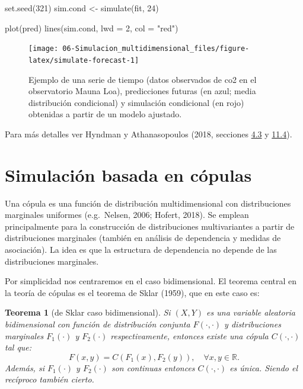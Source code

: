 \documentclass[
]{book}
\newenvironment{Shaded}{\begin{snugshade}}{\end{snugshade}}
\newcommand{\AttributeTok}[1]{\textcolor[rgb]{0.77,0.63,0.00}{#1}}
\newcommand{\DecValTok}[1]{\textcolor[rgb]{0.00,0.00,0.81}{#1}}
\newcommand{\FunctionTok}[1]{\textcolor[rgb]{0.00,0.00,0.00}{#1}}
\newcommand{\NormalTok}[1]{#1}
\newcommand{\OtherTok}[1]{\textcolor[rgb]{0.56,0.35,0.01}{#1}}
\newcommand{\StringTok}[1]{\textcolor[rgb]{0.31,0.60,0.02}{#1}}
\theoremstyle{break}
\newtheorem{theorem}{Teorema}[chapter]
\theoremstyle{nonumberplain}
\begin{document}
\begin{Shaded}
\begin{Highlighting}[]
\FunctionTok{set.seed}\NormalTok{(}\DecValTok{321}\NormalTok{)}
\NormalTok{sim.cond }\OtherTok{\textless{}{-}} \FunctionTok{simulate}\NormalTok{(fit, }\DecValTok{24}\NormalTok{)}

\FunctionTok{plot}\NormalTok{(pred)}
\FunctionTok{lines}\NormalTok{(sim.cond, }\AttributeTok{lwd =} \DecValTok{2}\NormalTok{, }\AttributeTok{col =} \StringTok{"red"}\NormalTok{)}
\end{Highlighting}
\end{Shaded}

\begin{figure}[!htb]

{\centering \texttt{[image: 06-Simulacion\_multidimensional\_files/figure-latex/simulate-forecast-1]} 

}

\caption{Ejemplo de una serie de tiempo (datos observados de co2 en el observatorio Mauna Loa), predicciones futuras (en azul; media distribución condicional) y simulación condicional (en rojo) obtenidas a partir de un modelo ajustado.}\label{fig:simulate-forecast}
\end{figure}

Para más detalles ver Hyndman y Athanasopoulos (2018, secciones \href{https://otexts.com/fpp2/prediction-intervals.html}{4.3} y \href{https://otexts.com/fpp2/bootstrap.html}{11.4}).

\hypertarget{simulaciuxf3n-basada-en-cuxf3pulas}{%
\section{Simulación basada en cópulas}\label{simulaciuxf3n-basada-en-cuxf3pulas}}

Una cópula es una función de distribución multidimensional con distribuciones marginales uniformes (e.g.~Nelsen, 2006; Hofert, 2018).
Se emplean principalmente para la construcción de distribuciones multivariantes a partir de distribuciones marginales (también en análisis de dependencia y medidas de asociación).
La idea es que la estructura de dependencia no depende de las distribuciones marginales.

Por simplicidad nos centraremos en el caso bidimensional.
El teorema central en la teoría de cópulas es el teorema de Sklar (1959), que en este caso es:

\begin{theorem}[de Sklar caso bidimensional]
\protect\hypertarget{thm:sklar}{}\label{thm:sklar}
Si \((X,Y)\) es una variable aleatoria bidimensional con función de distribución conjunta \(F(\cdot,\cdot)\) y distribuciones marginales \(F_1(\cdot)\) y \(F_2(\cdot)\) respectivamente, entonces existe una cópula \(C(\cdot,\cdot)\) tal que:
\[F(x,y)=C\left( F_1(x),F_2(y)\right) ,\quad \forall x,y\in\mathbb{R}.\]
Además, si \(F_1(\cdot)\) y \(F_2(\cdot)\) son continuas entonces \(C(\cdot,\cdot)\) es única.
Siendo el recíproco también cierto.
\end{theorem}
\end{document}
